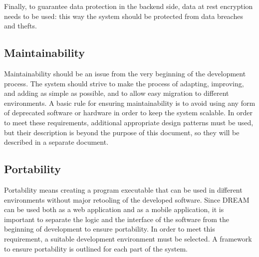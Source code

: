 \documentclass[../../main.tex]{subfiles}
\begin{document}
	Finally, to guarantee data protection in the backend side, data at rest encryption needs to be used: this way the system should be protected 
	from data breaches and thefts.

	\subsection{Maintainability}

	Maintainability should be an issue from the very beginning of the development process. The system should strive to make the process of adapting, improving, and adding as simple as possible, and to allow easy migration to different environments.
	A basic rule for ensuring maintainability is to avoid using any form of deprecated software or hardware in order to keep the system scalable.
	In order to meet these requirements, additional appropriate design patterns must be used, but their description is beyond the purpose of this document, so they will be described in a separate document.

	\subsection{Portability}
	Portability means creating a program executable that can be used in different environments without major retooling of the developed software.
	Since DREAM can be used both as a web application and as a mobile application, it is important to separate the logic and the interface of the software from the beginning of development to ensure portability.
	In order to meet this requirement, a suitable development environment must be selected. A framework to ensure portability is outlined for each part of the system.

	
\end{document}
